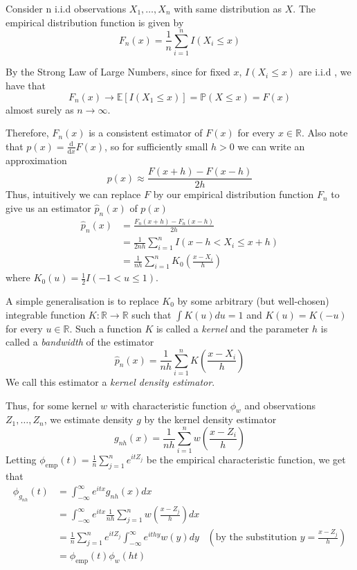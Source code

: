 \documentclass[a4paper,11pt]{article}
\theoremstyle{theorem}
\theoremstyle{definition}
\theoremstyle{remark}
\providecommand{\E}{\mathbb{E}}
\begin{document}
Consider n i.i.d observations $X_{1}, \dotsc , X_{n}$ with same distribution as $X$. The empirical distribution function is given by 
\[
F_{n}(x) = \frac{1}{n}\sum_{i=1}^{n}{I(X_{i} \leq x)}
\]  

By the Strong Law of Large Numbers, since for fixed $x$, $I(X_{i} \leq x)$ are i.i.d , we have that
\[
F_{n}(x) \to \E \left[ I(X_{1} \leq x) \right] = \mathbb{P}(X \leq x) = F(x)
\]
almost surely as $n \to \infty$.

Therefore, $F_{n}(x)$ is a consistent estimator of $F(x)$ for every $x \in \mathbb{R}$. Also note that $p(x) = \frac{\mathrm{d}}{\mathrm{d}x}F(x)$, so for sufficiently small $h > 0$ we can write an approximation
\[
p(x) \approx \frac{F(x+h) - F(x-h)}{2h}
\]
Thus, intuitively we can replace $F$ by our empirical distribution function $F_{n}$ to give us an estimator $\hat{p}_{n}(x)$ of $p(x)$
\begin{align*}
\hat{p}_{n}(x) &= \frac{F_{n}(x+h) - F_{n}(x-h)}{2h} \\
               &= \frac{1}{2nh}\sum_{i=1}^{n}{I(x - h < X_{i} \leq x + h)} \\
               &= \frac{1}{nh}\sum_{i=1}^{n}{K_{0}\left(\frac{x - X_{i}}{h}\right)}
\end{align*}
where $K_{0}(u) = \frac{1}{2}I(-1 < u \leq 1)$.

A simple generalisation is to replace $K_{0}$ by some arbitrary (but well-chosen) integrable function $K : \mathbb{R} \to \mathbb{R}$ such that $\int{K(u)}du = 1$ and $K(u) = K(-u)$ for every $u \in \mathbb{R}$. Such a function $K$ is called a \textit{kernel} and the parameter $h$ is called a \textit{bandwidth} of the estimator
\begin{equation} \label{kde}
\hat{p}_{n}(x) = \frac{1}{nh}\sum_{i=1}^{n}{K\left(\frac{x - X_{i}}{h}\right)}
\end{equation}
We call this estimator a \textit{kernel density estimator}.

Thus, for some kernel $w$ with characteristic function $\phi_{w}$ and observations $Z_{1}, \dotsc , Z_{n}$, we estimate density $g$ by the kernel density estimator
\[
g_{nh}(x) = \frac{1}{nh}\sum_{i=1}^{n}{w\left(\frac{x - Z_{i}}{h}\right)}
\]
Letting $\phi_{\text{emp}}(t) = \frac{1}{n}\sum_{j=1}^{n}{e^{itZ_{j}}}$ be the empirical characteristic function, we get that
\begin{align*} \label{charformula}
\phi_{g_{nh}}(t) &= \int_{-\infty}^{\infty}{e^{itx}g_{nh}(x)}dx \\
                 &= \int_{-\infty}^{\infty}{e^{itx}\frac{1}{nh}\sum_{j=1}^{n}{w\left(\frac{x - Z_{j}}{h}\right)}}dx \\
                 &= \frac{1}{n}\sum_{j=1}^{n}{e^{itZ_{j}}}\int_{-\infty}^{\infty}{e^{ithy}w(y)}dy &\left(\text{by the substitution } y = \frac{x - Z_{j}}{h} \right) \\
                 &= \phi_{\text{emp}}(t)\phi_{w}(ht)
\end{align*}
\end{document}
